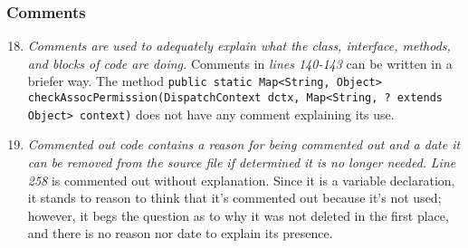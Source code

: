 	\subsubsection{Comments}
		\begin{enumerate}
			\setcounter{enumi}{17}
			\item \textit{Comments are used to adequately explain what the class, interface, methods, and blocks of code are doing.}\newline
			Comments in \textit{lines 140-143} can be written in a briefer way. 
			The method \texttt{public static Map<String, Object> checkAssocPermission(DispatchContext dctx, Map<String, ? extends Object> context)} does not have any comment explaining its use. 

			\item \textit{Commented out code contains a reason for being commented out and a date it can be removed from the source file if determined it is no longer needed.}\newline
			\textit{Line 258} is commented out without explanation. Since it is a variable declaration, it stands to reason to think that it's commented out because it's not used; however, it begs the question as to why it was not deleted in the first place, and there is no reason nor date to explain its presence.

		\end{enumerate}

